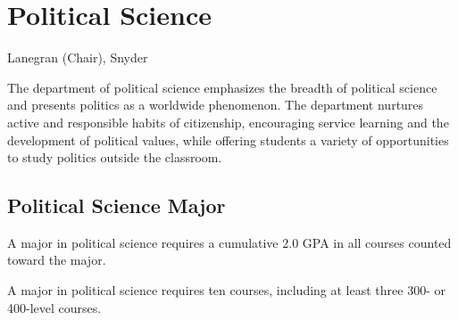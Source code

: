 \documentclass[
  letterpaper,
]{scrbook}
\begin{document}
\section{Political Science}\label{political-science}

Lanegran (Chair), Snyder

The department of political science emphasizes the breadth of political
science and presents politics as a worldwide phenomenon. The department
nurtures active and responsible habits of citizenship, encouraging
service learning and the development of political values, while offering
students a variety of opportunities to study politics outside the
classroom.

\subsection{Political Science Major}\label{political-science-major}

A major in political science requires a cumulative 2.0 GPA in all
courses counted toward the major.

A major in political science requires ten courses, including at least
three 300- or 400-level courses.
\end{document}
